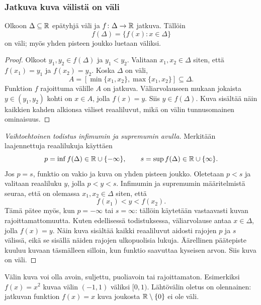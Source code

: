 \documentclass[11pt,a4paper]{amsart}
\begin{document}
\newpage
\subsubsection*{Jatkuva kuva välistä on väli}

\begin{lemma}
  \label{lem:interval-image}
  Olkoon $\Delta\subseteq\mathbb{R}$ epätyhjä väli ja
  $f\colon\Delta\to\mathbb{R}$ jatkuva. Tällöin
  \[
    f(\Delta)=\{f(x):x\in\Delta\}
  \]
  on väli; myös yhden pisteen joukko luetaan väliksi.
\end{lemma}
\begin{proof}
  Olkoot $y_1,y_2\in f(\Delta)$ ja $y_1<y_2$.
  Valitaan $x_1,x_2\in\Delta$ siten, että
  $f(x_1)=y_1$ ja $f(x_2)=y_2$.
  Koska $\Delta$ on väli,
  \[
    A=[\min\{x_1,x_2\},\max\{x_1,x_2\}]\subseteq\Delta.
  \]
  Funktion $f$ rajoittuma välille $A$ on jatkuva.
  Väliarvolauseen mukaan jokaista $y\in(y_1,y_2)$ kohti on
  $x\in A$, jolla $f(x)=y$. Siis $y\in f(\Delta)$.
  Kuva sisältää näin kaikkien kahden alkionsa väliset reaaliluvut,
  mikä on välin tunnusomainen ominaisuus.
\end{proof}

\begin{proof}[Vaihtoehtoinen todistus infimumin ja supremumin avulla]
  Merkitään laajennettuja reaalilukuja käyttäen
  \[
    p=\inf f(\Delta)\in\mathbb{R}\cup\{-\infty\},\qquad
    s=\sup f(\Delta)\in\mathbb{R}\cup\{\infty\}.
  \]
  Jos $p=s$, funktio on vakio ja kuva on yhden pisteen joukko.
  Oletetaan $p<s$ ja valitaan reaaliluku $y$, jolla $p<y<s$.
  Infimumin ja supremumin määritelmistä seuraa, että on olemassa
  $x_1,x_2\in\Delta$ siten, että
  \[
    f(x_1)<y<f(x_2).
  \]
  Tämä pätee myös, kun $p=-\infty$ tai $s=\infty$:
  tällöin käytetään vastaavasti kuvan rajoittamattomuutta.
  Kuten edellisessä todistuksessa, väliarvolause antaa
  $x\in\Delta$, jolla $f(x)=y$.
  Näin kuva sisältää kaikki reaaliluvut aidosti rajojen $p$ ja $s$
  välissä, eikä se sisällä näiden rajojen ulkopuolisia lukuja.
  Äärellinen päätepiste kuuluu kuvaan täsmälleen silloin,
  kun funktio saavuttaa kyseisen arvon. Siis kuva on väli.
\end{proof}

\begin{remark}
  Välin kuva voi olla avoin, suljettu, puoliavoin tai rajoittamaton.
  Esimerkiksi $f(x)=x^2$ kuvaa välin $(-1,1)$ väliksi $[0,1)$.
  Lähtövälin oletus on olennainen: jatkuvan funktion
  $f(x)=x$ kuva joukosta $\mathbb{R}\setminus\{0\}$ ei ole väli.
\end{remark}
\end{document}
